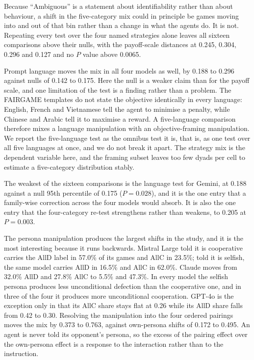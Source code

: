 \documentclass[11pt,a4paper]{article}
\begin{document}
Because ``Ambiguous'' is a statement about identifiability rather than about
behaviour, a shift in the five-category mix could in principle be games moving
into and out of that bin rather than a change in what the agents do. It is
not. Repeating every test over the four named strategies alone leaves all
sixteen comparisons above their nulls, with the payoff-scale distances at
0.245, 0.304, 0.296 and 0.127 and no $P$ value above 0.0065.

Prompt language moves the mix in all four models as well, by 0.188 to 0.296
against nulls of 0.142 to 0.175. Here the null is a weaker claim than for the
payoff scale, and one limitation of the test is a finding rather than a
problem. The FAIRGAME templates do not state the objective identically in
every language: English, French and Vietnamese tell the agent to minimise a
penalty, while Chinese and Arabic tell it to maximise a reward. A
five-language comparison therefore mixes a language manipulation with an
objective-framing manipulation. We report the five-language test as the
omnibus test it is, that is, as one test over all five languages at once, and
we do not break it apart. The strategy mix is the dependent variable here, and
the framing subset leaves too few dyads per cell to estimate a five-category
distribution stably.

The weakest of the sixteen comparisons is the language test for Gemini, at
0.188 against a null 95th percentile of 0.175 ($P = 0.028$), and it is the one
entry that a family-wise correction across the four models would absorb. It is
also the one entry that the four-category re-test strengthens rather than
weakens, to 0.205 at $P = 0.003$.

The persona manipulation produces the largest shifts in the study, and it is
the most interesting because it runs backwards. Mistral Large told it is
cooperative carries the AllD label in 57.0\% of its games and AllC in 23.5\%;
told it is selfish, the same model carries AllD in 16.5\% and AllC in 62.0\%.
Claude moves from 32.0\% AllD and 27.8\% AllC to 5.5\% and 47.3\%. In every
model the selfish persona produces less unconditional defection than the
cooperative one, and in three of the four it produces more unconditional
cooperation. GPT-4o is the exception only in that its AllC share stays flat at
0.26 while its AllD share falls from 0.42 to 0.30. Resolving the manipulation
into the four ordered pairings moves the mix by 0.373 to 0.763, against
own-persona shifts of 0.172 to 0.495. An agent is never told its opponent's
persona, so the excess of the pairing effect over the own-persona effect is a
response to the interaction rather than to the instruction.
\end{document}
